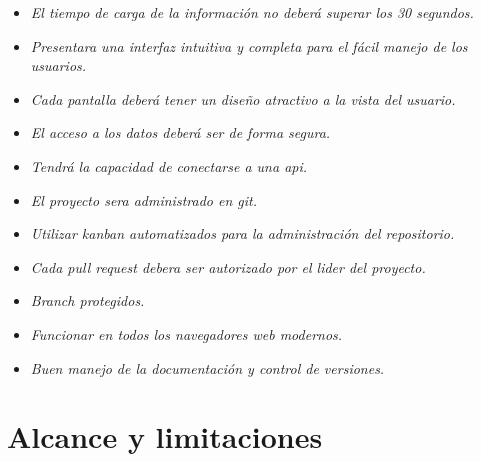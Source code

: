 \documentclass[12pt,a4paper]{book}
\begin{document}
\begin{itemize}
\item \textit{El tiempo de carga de la información no deberá superar los 30 segundos.}
\item \textit{Presentara una interfaz intuitiva y completa para el fácil manejo de los usuarios.}
\item \textit{Cada pantalla deberá tener un diseño atractivo a la vista del usuario.}
\item \textit{El acceso a los datos deberá ser de forma segura.}
\item \textit{Tendrá la capacidad de conectarse a una api.}
\item \textit{El proyecto sera administrado en git.}
\item \textit{Utilizar kanban automatizados para la administración del repositorio.}
\item \textit{Cada pull request debera ser autorizado por el lider del proyecto.}
\item \textit{Branch protegidos.}
\item \textit{Funcionar en todos los navegadores web modernos.}
\item \textit{Buen manejo de la documentación y control de versiones.}
\end{itemize}

\chapter{Alcance y limitaciones}
\end{document}
